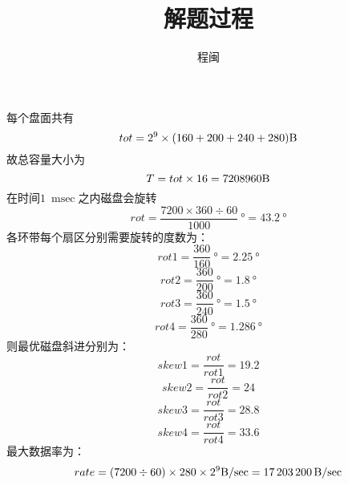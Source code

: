 \documentclass{article}
\title{解题过程}
\author{程闽}
\begin{document}
  
	\maketitle

	每个盘面共有
	$$
	tot = 2^{9} \times (160 + 200 + 240 + 280)\SI{}{\byte}
	$$
	故总容量大小为
	$$
	T = tot \times 16 = 7208960 \SI{}{\byte}
	$$
	在时间$\SI{1}{\milli\sec}$之内磁盘会旋转
	$$rot = \frac{7200 \times 360 \div 60}{1000}\SI{}{\degree} = \SI{43.2}{\degree}$$ 
	各环带每个扇区分别需要旋转的度数为：
	$$
		rot1 = \frac{360}{160}\SI{}{\degree} = \SI{2.25}{\degree}
	$$
	$$
		rot2 = \frac{360}{200}\SI{}{\degree} = \SI{1.8}{\degree}
	$$	
	$$
		rot3 = \frac{360}{240}\SI{}{\degree} = \SI{1.5}{\degree}
	$$
	$$
		rot4 = \frac{360}{280}\SI{}{\degree} = \SI{1.286}{\degree}
	$$
	则最优磁盘斜进分别为：
	$$
	skew1 = \frac{rot}{rot1} = 19.2
	$$
	$$
	skew2 = \frac{rot}{rot2}= 24
	$$	
	$$
	skew3 = \frac{rot}{rot3} = 28.8
	$$
	$$
	skew4 = \frac{rot}{rot4} = 33.6
	$$
	最大数据率为：
	$$
	rate = (7200 \div 60) \times 280 \times 2^{9} \SI{}{\byte\per\sec} = \SI{17203200}{\byte\per\sec} 
	$$
\end{document}
